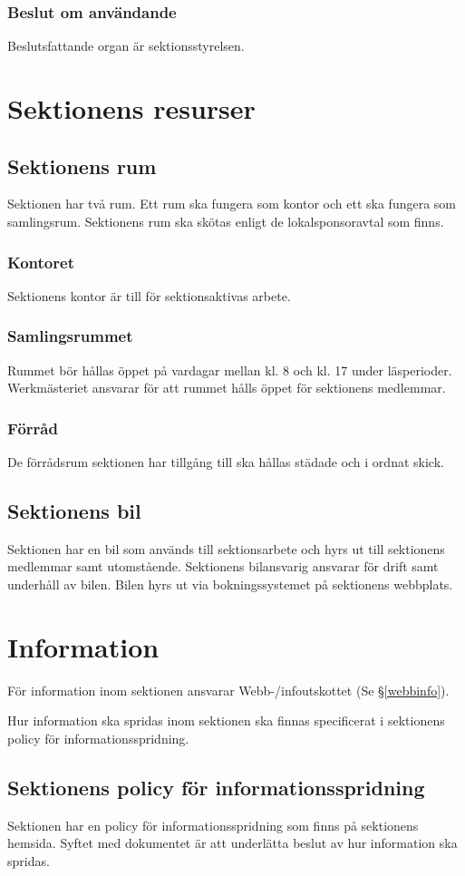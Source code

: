 \documentclass{datateknologsektionen-document}
\begin{document}
\subsubsection{Beslut om användande}
Beslutsfattande organ är sektionsstyrelsen.

\section{Sektionens resurser}
\subsection{Sektionens rum}
Sektionen har två rum. Ett rum ska fungera som kontor och ett ska fungera som samlingsrum.
Sektionens rum ska skötas enligt de lokalsponsoravtal som finns.
\subsubsection{Kontoret}
Sektionens kontor är till för sektionsaktivas arbete.
\subsubsection{Samlingsrummet}
Rummet bör hållas öppet på vardagar mellan kl. 8 och kl. 17 under läsperioder.
Werkmästeriet ansvarar för att rummet hålls öppet för sektionens medlemmar.
\subsubsection{Förråd}
De förrådsrum sektionen har tillgång till ska hållas städade och i ordnat skick.
\subsection{Sektionens bil}
Sektionen har en bil som används till sektionsarbete och hyrs ut till sektionens medlemmar samt
utomstående. Sektionens bilansvarig ansvarar för drift samt underhåll av bilen. Bilen hyrs ut via
bokningssystemet på sektionens webbplats.

\section{Information}
För information inom sektionen ansvarar Webb-/infoutskottet (Se \S \ref{webbinfo}).

Hur information ska spridas inom sektionen ska finnas specificerat i sektionens policy för
informationsspridning.
\subsection{Sektionens policy för informationsspridning}
Sektionen har en policy för informationsspridning som finns på sektionens hemsida. Syftet med
dokumentet är att underlätta beslut av hur information ska spridas.
\end{document}
